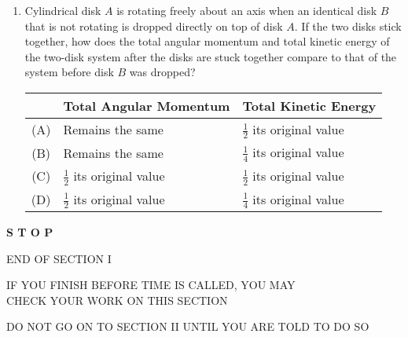 \documentclass[11pt]{article}
\newcommand{\pic}[2]{\texttt{[image: \#2]}}
\begin{document}
\begin{multicols}{2}
\begin{enumerate}[leftmargin=18pt,resume]
    \begin{center}
      \pic{.21}{disks}
    \end{center}
  \item Cylindrical disk $A$ is rotating freely about an axis when an
    identical disk $B$ that is not rotating is dropped directly on top of disk
    $A$. If the two disks stick together, how does the total angular momentum
    and total kinetic energy of the two-disk system after the disks are stuck
    together compare to that of the system before disk $B$ was dropped?
      
    \begin{tabular}{cll}
      & Total Angular Momentum & Total Kinetic Energy\\
      \hline
      (A) & Remains the same & $\frac12$ its original value\\
      (B) & Remains the same & $\frac14$ its original value\\
      (C) & $\frac12$ its original value & $\frac12$ its original value\\
      (D) & $\frac12$ its original value & $\frac14$ its original value
    \end{tabular}
  \end{enumerate}
\end{multicols}

\begin{center}
  \textbf{\LARGE S T O P}
  
  \vspace{.3in}END OF SECTION I

  \vspace{.3in}IF YOU FINISH BEFORE TIME IS CALLED, YOU MAY\\
  CHECK YOUR WORK ON THIS SECTION

  \vspace{.3in}DO NOT GO ON TO SECTION II UNTIL YOU ARE TOLD TO DO SO
\end{center}
\end{document}
